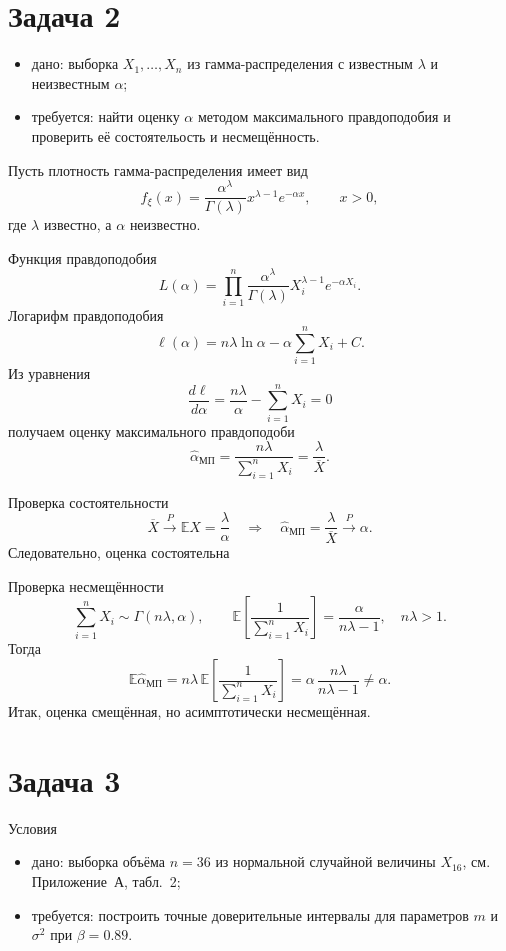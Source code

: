 \documentclass[a4paper,14pt]{extarticle}
\begin{document}
\section{Задача 2}


\begin{itemize}
    \item дано: выборка \(X_1,\dots,X_n\) из гамма-распределения с известным \(\lambda\) и неизвестным \(\alpha\);
    \item требуется: найти оценку \(\alpha\) методом максимального правдоподобия и проверить её состоятельость и несмещённость.
\end{itemize}

Пусть плотность гамма-распределения имеет вид
\[
f_{\xi}(x)=\frac{\alpha^{\lambda}}{\Gamma(\lambda)}x^{\lambda-1}e^{-\alpha x},\qquad x>0,
\]
где \(\lambda\) известно, а \(\alpha\) неизвестно.

Функция правдоподобия
\[
L(\alpha)=\prod_{i=1}^{n}\frac{\alpha^{\lambda}}{\Gamma(\lambda)}X_i^{\lambda-1}e^{-\alpha X_i}.
\]
Логарифм правдоподобия
\[
\ell(\alpha)=n\lambda\ln\alpha-\alpha\sum_{i=1}^{n}X_i + C.
\]
Из уравнения
\[
\frac{d\ell}{d\alpha}=\frac{n\lambda}{\alpha}-\sum_{i=1}^{n}X_i=0
\]
получаем оценку максимального правдоподоби
\[
\hat{\alpha}_{\text{МП}}=\frac{n\lambda}{\sum_{i=1}^{n}X_i}=\frac{\lambda}{\overline{X}}.
\]

Проверка состоятельности
\[
\overline{X}\xrightarrow{P}\mathbb{E}X=\frac{\lambda}{\alpha}
\quad \Longrightarrow \quad
\hat{\alpha}_{\text{МП}}=\frac{\lambda}{\overline{X}}\xrightarrow{P}\alpha.
\]
Следовательно, оценка состоятельна

Проверка несмещённости
\[
\sum_{i=1}^{n}X_i \sim \Gamma(n\lambda,\alpha), \qquad
\mathbb{E}\!\left[\frac{1}{\sum_{i=1}^{n}X_i}\right]=\frac{\alpha}{n\lambda-1}, \quad n\lambda>1.
\]
Тогда
\[
\mathbb{E}\hat{\alpha}_{\text{МП}}
=n\lambda\,\mathbb{E}\!\left[\frac{1}{\sum_{i=1}^{n}X_i}\right]
=\alpha\,\frac{n\lambda}{n\lambda-1}\neq \alpha.
\]
Итак, оценка смещённая, но асимптотически несмещённая.

\section{Задача 3}

Условия
\begin{itemize}
    \item дано: выборка объёма \(n=36\) из нормальной случайной величины \(X_{16}\), см. Приложение~А, табл.~2;
    \item требуется: построить точные доверительные интервалы для параметров \(m\) и \(\sigma^2\) при \(\beta=0.89\).
\end{itemize}
\end{document}
